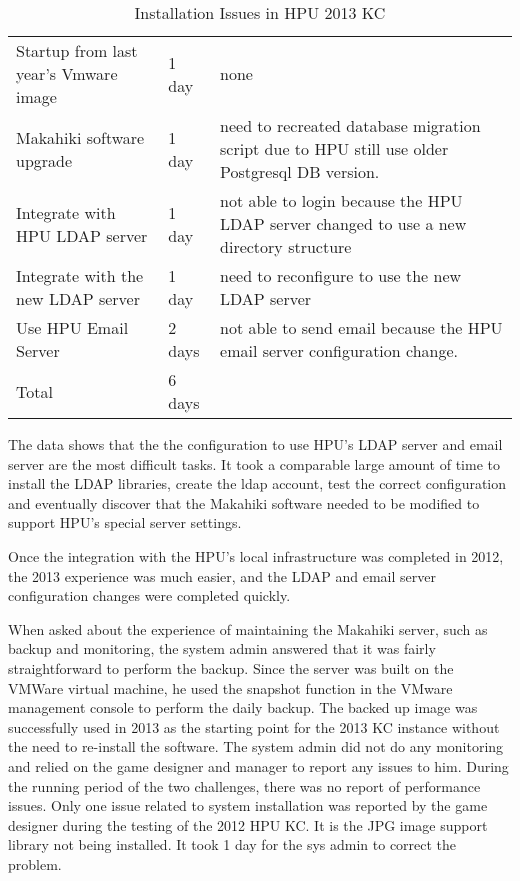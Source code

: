 \begin{table}[ht!]
  \centering
  \begin{tabular}{|P{0.28\columnwidth}|P{0.1\columnwidth}|p{0.5\columnwidth}|}
    \hline
      &
      &
      \\
    \hline
     Startup from last year's Vmware image & 1 day &  none\\
    \hline
     Makahiki software upgrade & 1 day & need to recreated database migration script due to HPU still use older Postgresql DB version. \\
    \hline
    Integrate with HPU LDAP server & 1 day  & not able to login because the HPU LDAP server changed to use a new directory structure \\
    \hline
     Integrate with the new LDAP server &  1 day &  need to reconfigure to use the new LDAP server\\
    \hline
    Use HPU Email Server & 2 days & not able to send email because the HPU email server configuration change. \\
    \hline
    Total & 6 days & \\
    \hline \end{tabular}
  \caption{Installation Issues in HPU 2013 KC }
  \label{fig:makahiki-install-hpu2013}
\end{table}

The data shows that the the configuration to use HPU's LDAP server and email server are the most difficult tasks. It took a comparable large amount of time to install the LDAP libraries, create the ldap account, test the correct configuration and eventually discover that the Makahiki software needed to be modified to support HPU's special server settings. 

Once the integration with the HPU's local infrastructure was completed in 2012, the 2013 experience was much easier, and the LDAP and email server configuration changes were completed quickly. 

When asked about the experience of maintaining the Makahiki server, such as backup and monitoring, the system admin answered that it was fairly straightforward to perform the backup. Since the server was built on the VMWare virtual machine, he used the snapshot function in the VMware management console to perform the daily backup. The backed up image was successfully used in 2013 as the starting point for the 2013 KC instance without the need to re-install the software. The system admin did not do any monitoring and relied on the game designer and manager to report any issues to him. During the running period of the two challenges, there was no report of performance issues. Only one issue related to system installation was reported by the game designer during the testing of the 2012 HPU KC. It is the JPG image support library not being installed. It took 1 day for the sys admin to correct the problem.

